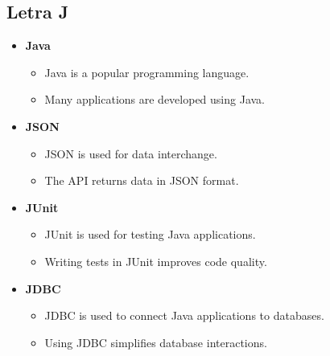     \subsection{Letra J}
    \begin{itemize}
        \item \textbf{Java}
        \begin{itemize}
            \item Java is a popular programming language.
            \item Many applications are developed using Java.
        \end{itemize}
        \item \textbf{JSON}
        \begin{itemize}
            \item JSON is used for data interchange.
            \item The API returns data in JSON format.
        \end{itemize}
        \item \textbf{JUnit}
        \begin{itemize}
            \item JUnit is used for testing Java applications.
            \item Writing tests in JUnit improves code quality.
        \end{itemize}
        \item \textbf{JDBC}
        \begin{itemize}
            \item JDBC is used to connect Java applications to databases.
            \item Using JDBC simplifies database interactions.
        \end{itemize}
    \end{itemize}


